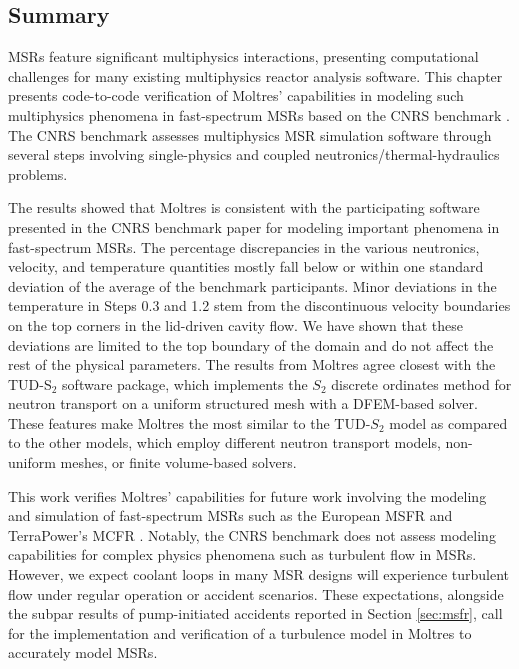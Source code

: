 \subsection{Summary}

\glspl{MSR} feature significant multiphysics interactions, presenting
computational challenges for many existing multiphysics reactor analysis
software. This chapter presents code-to-code verification of Moltres'
capabilities in modeling such multiphysics phenomena in fast-spectrum
\glspl{MSR} based on the CNRS benchmark \cite{tiberga_results_2020}.
The CNRS benchmark assesses multiphysics \gls{MSR} simulation
software through several steps involving single-physics and coupled
neutronics/thermal-hydraulics problems.

The results showed that Moltres is consistent with the participating software
presented in the CNRS benchmark paper for modeling important phenomena
in fast-spectrum \glspl{MSR}. The percentage discrepancies in the various
neutronics, velocity, and temperature quantities mostly fall below or within
one standard deviation of the average of the benchmark participants.
Minor deviations in the temperature in Steps 0.3 and 1.2 
stem from the discontinuous velocity
boundaries on the top corners in the lid-driven cavity flow. We have shown that
these deviations are limited to the top boundary of the domain and do not
affect the rest of the physical parameters. The results from
Moltres agree closest with the TUD-S$_2$ software package, which implements the
$S_2$ discrete ordinates method for
neutron transport on a uniform structured mesh with a \gls{DFEM}-based solver.
These features make Moltres the most similar to the TUD-$S_2$ model as compared
to the other models, which employ different neutron transport models,
non-uniform meshes, or finite volume-based solvers.

This work verifies Moltres' capabilities for future work involving the modeling and
simulation of fast-spectrum \glspl{MSR} such as the European \gls{MSFR} and
TerraPower's \gls{MCFR} \cite{terrapower_terrapower_2021}. Notably, the CNRS
benchmark does not assess modeling capabilities for complex physics phenomena
such as turbulent flow in \glspl{MSR}. However, we expect coolant loops in many \gls{MSR} designs
will experience turbulent flow under regular operation or accident scenarios.
These expectations, alongside the subpar results of pump-initiated accidents
reported in Section \ref{sec:msfr}, call for the implementation and
verification of a turbulence model in Moltres to accurately model \glspl{MSR}.

\FloatBarrier
